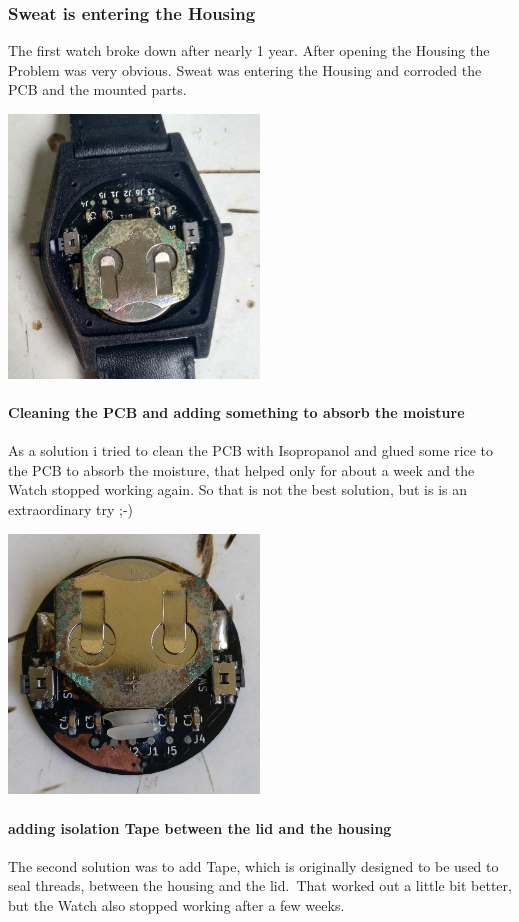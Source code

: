 \subsubsection{Sweat is entering the Housing}
The first watch broke down after nearly 1 year. After opening the Housing the Problem was very obvious. Sweat was entering the Housing and corroded the PCB and the mounted parts.
\begin{center}
  \includegraphics[width=0.5\textwidth]{../Pictures/ProbCorr1.jpg}
\end{center}
\paragraph{Cleaning the PCB and adding something to absorb the moisture}
As a solution i tried to clean the PCB with Isopropanol and glued some rice to the PCB to absorb the moisture, that helped only for about a week and the Watch stopped working again. So that is not the best solution, but is is an extraordinary try ;-)
\begin{center}
  \includegraphics[width=0.5\textwidth]{../Pictures/ProbCorrSol1.jpg}
\end{center}
\paragraph{adding isolation Tape between the lid and the housing}
The second solution was to add Tape, which is originally designed to be used to seal threads, between the housing and the lid.\
That worked out a little bit better, but the Watch also stopped working after a few weeks. 
